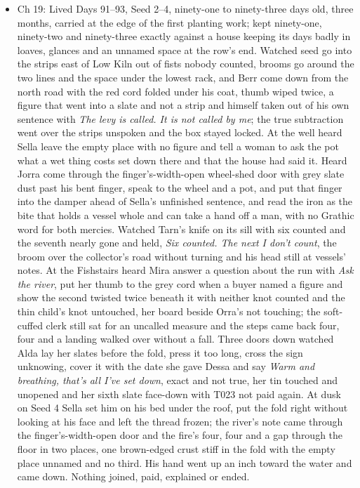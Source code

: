 \documentclass{design/chronicle}
\begin{document}
{\begin{itemize}[leftmargin=1.4em,itemsep=1pt,topsep=3pt,parsep=0pt]
\item Ch 19: Lived Days 91–93, Seed 2–4, ninety-one to ninety-three days old, three months, carried at the edge of the first planting work; kept ninety-one, ninety-two and ninety-three exactly against a house keeping its days badly in loaves, glances and an unnamed space at the row’s end. Watched seed go into the strips east of Low Kiln out of fists nobody counted, brooms go around the two lines and the space under the lowest rack, and Berr come down from the north road with the red cord folded under his coat, thumb wiped twice, a figure that went into a slate and not a strip and himself taken out of his own sentence with \emph{The levy is called. It is not called by me}; the true subtraction went over the strips unspoken and the box stayed locked. At the well heard Sella leave the empty place with no figure and tell a woman to ask the pot what a wet thing costs set down there and that the house had said it. Heard Jorra come through the finger’s-width-open wheel-shed door with grey slate dust past his bent finger, speak to the wheel and a pot, and put that finger into the damper ahead of Sella’s unfinished sentence, and read the iron as the bite that holds a vessel whole and can take a hand off a man, with no Grathic word for both mercies. Watched Tarn’s knife on its sill with six counted and the seventh nearly gone and held, \emph{Six counted. The next I don’t count}, the broom over the collector’s road without turning and his head still at vessels’ notes. At the Fishstairs heard Mira answer a question about the run with \emph{Ask the river}, put her thumb to the grey cord when a buyer named a figure and show the second twisted twice beneath it with neither knot counted and the thin child’s knot untouched, her board beside Orra’s not touching; the soft-cuffed clerk still sat for an uncalled measure and the steps came back four, four and a landing walked over without a fall. Three doors down watched Alda lay her slates before the fold, press it too long, cross the sign unknowing, cover it with the date she gave Dessa and say \emph{Warm and breathing, that’s all I’ve set down}, exact and not true, her tin touched and unopened and her sixth slate face-down with T023 not paid again. At dusk on Seed 4 Sella set him on his bed under the roof, put the fold right without looking at his face and left the thread frozen; the river’s note came through the finger’s-width-open door and the fire’s four, four and a gap through the floor in two places, one brown-edged crust stiff in the fold with the empty place unnamed and no third. His hand went up an inch toward the water and came down. Nothing joined, paid, explained or ended.


\end{itemize}}
\end{document}
